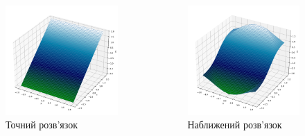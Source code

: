 \documentclass{beamer}
\numberwithin{equation}{section}
\begin{document}
	\begin{frame}
		\begin{columns}[c] 
			\begin{figure}
				\includegraphics[width=1\textwidth]{resources/x_ex.pdf}
				\caption{Точний розв'язок}	
			\end{figure}
						
			\begin{figure}
				\includegraphics[width=1\textwidth]{resources/x_approx.pdf}
				\caption{Наближений розв'язок}
			\end{figure}
						
		\end{columns}
		
	\end{frame}	
		
\end{document}
